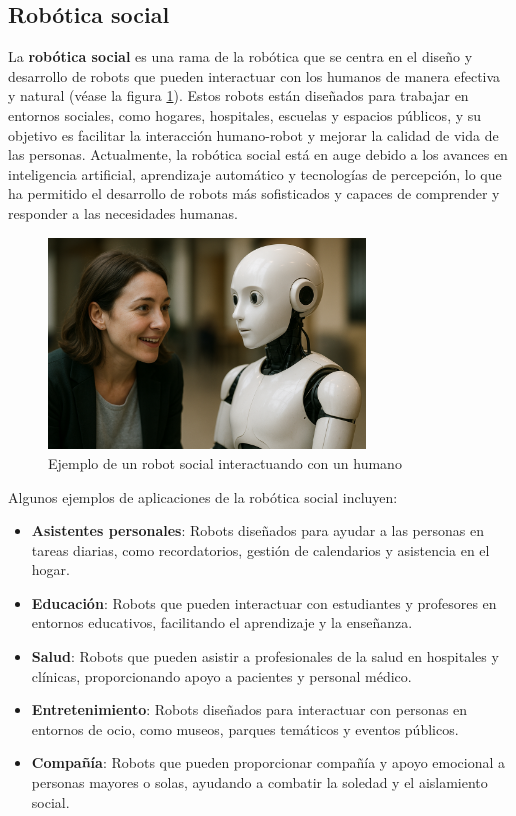 \documentclass[../main.tex]{subfiles}
\begin{document}
\subsection{Robótica social}
La \textbf{robótica social} es una rama de la robótica que se centra en el diseño y desarrollo de robots que pueden interactuar con los humanos de manera efectiva y natural (véase la figura \ref{fig:robotica_social}). 
Estos robots están diseñados para trabajar en entornos sociales, como hogares, hospitales, escuelas y espacios públicos, y su objetivo es facilitar la interacción humano-robot y mejorar la calidad de vida de las personas.
Actualmente, la robótica social está en auge debido a los avances en inteligencia artificial, aprendizaje automático y tecnologías de percepción, lo que ha permitido el desarrollo de robots más sofisticados y capaces de comprender y responder a las necesidades humanas.

\begin{figure}[H]
\centering
\includegraphics[width=0.75\textwidth]{images/ea_social-robotics.png}
\caption{Ejemplo de un robot social interactuando con un humano}\label{fig:robotica_social}
\end{figure}

Algunos ejemplos de aplicaciones de la robótica social incluyen:
\begin{itemize}
    \item \textbf{Asistentes personales}: Robots diseñados para ayudar a las personas en tareas diarias, como recordatorios, gestión de calendarios y asistencia en el hogar.
    \item \textbf{Educación}: Robots que pueden interactuar con estudiantes y profesores en entornos educativos, facilitando el aprendizaje y la enseñanza.
    \item \textbf{Salud}: Robots que pueden asistir a profesionales de la salud en hospitales y clínicas, proporcionando apoyo a pacientes y personal médico.
    \item \textbf{Entretenimiento}: Robots diseñados para interactuar con personas en entornos de ocio, como museos, parques temáticos y eventos públicos.
    \item \textbf{Compañía}: Robots que pueden proporcionar compañía y apoyo emocional a personas mayores\cite{iglesias2024town} o solas, ayudando a combatir la soledad y el aislamiento social.
\end{itemize}
\end{document}

